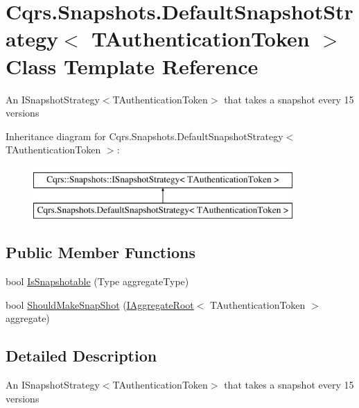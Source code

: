 \hypertarget{classCqrs_1_1Snapshots_1_1DefaultSnapshotStrategy}{}\section{Cqrs.\+Snapshots.\+Default\+Snapshot\+Strategy$<$ T\+Authentication\+Token $>$ Class Template Reference}
\label{classCqrs_1_1Snapshots_1_1DefaultSnapshotStrategy}


An I\+Snapshot\+Strategy$<$\+T\+Authentication\+Token$>$ that takes a snapshot every 15 versions  


Inheritance diagram for Cqrs.\+Snapshots.\+Default\+Snapshot\+Strategy$<$ T\+Authentication\+Token $>$\+:\begin{figure}[H]
\begin{center}
\leavevmode
\includegraphics[height=2.000000cm]{classCqrs_1_1Snapshots_1_1DefaultSnapshotStrategy}
\end{center}
\end{figure}
\subsection*{Public Member Functions}
\begin{DoxyCompactItemize}
\item 
bool \hyperlink{classCqrs_1_1Snapshots_1_1DefaultSnapshotStrategy_aea1e973d654aaee6f620543be7343fda}{Is\+Snapshotable} (Type aggregate\+Type)
\item 
bool \hyperlink{classCqrs_1_1Snapshots_1_1DefaultSnapshotStrategy_a59ee11e5c488a40933685e232661df39}{Should\+Make\+Snap\+Shot} (\hyperlink{interfaceCqrs_1_1Domain_1_1IAggregateRoot}{I\+Aggregate\+Root}$<$ T\+Authentication\+Token $>$ aggregate)
\end{DoxyCompactItemize}


\subsection{Detailed Description}
An I\+Snapshot\+Strategy$<$\+T\+Authentication\+Token$>$ that takes a snapshot every 15 versions 


